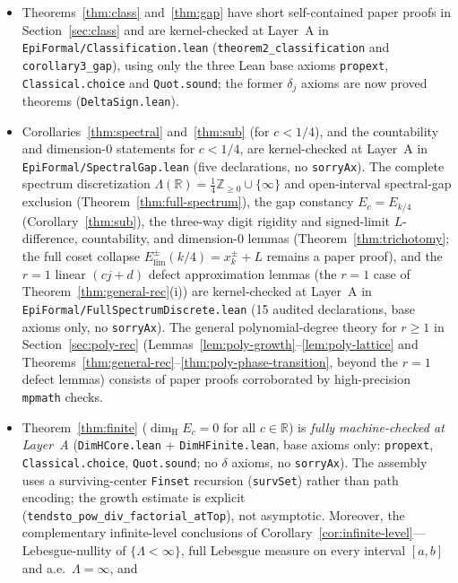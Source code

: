 \documentclass[11pt]{article}
\theoremstyle{definition}
\theoremstyle{remark}
\newcommand{\R}{\mathbb{R}}
\newcommand{\Z}{\mathbb{Z}}
\newcommand{\dimH}{\dim_{\mathrm{H}}}
\newcommand{\Lam}{\Lambda}
\begin{document}
\begin{itemize}[leftmargin=1.5em]
\item Theorems~\ref{thm:class} and~\ref{thm:gap} have short self-contained paper
proofs in Section~\ref{sec:class} and are kernel-checked at Layer~A in
\texttt{EpiFormal/\allowbreak Classification.lean}
(\texttt{theorem2\_classification} and \texttt{corollary3\_gap}), using only the
three Lean base axioms \texttt{propext}, \texttt{Classical.choice} and
\texttt{Quot.sound}; the former $\delta_j$ axioms are now proved theorems
(\texttt{DeltaSign.lean}).
\item Corollaries~\ref{thm:spectral} and~\ref{thm:sub} (for $c<1/4$), and the
countability and dimension-$0$ statements for $c<1/4$, are kernel-checked at
Layer~A in \texttt{EpiFormal/\allowbreak SpectralGap.lean} (five declarations,
no \texttt{sorryAx}). The complete spectrum discretization
$\Lam(\R)=\frac14\Z_{\ge0}\cup\{\infty\}$ and open-interval spectral-gap
exclusion (Theorem~\ref{thm:full-spectrum}), the gap constancy $E_c=E_{k/4}$
(Corollary~\ref{thm:sub}), the three-way digit rigidity and signed-limit
$L$-difference, countability, and dimension-$0$ lemmas
(Theorem~\ref{thm:trichotomy}; the full coset collapse
$E_{\mathrm{lim}}^\pm(k/4)=x_k^\pm+L$ remains a paper proof), and the $r=1$
linear $(cj+d)$ defect approximation lemmas (the $r=1$ case of
Theorem~\ref{thm:general-rec}(i)) are kernel-checked
at Layer~A in \texttt{EpiFormal/\allowbreak FullSpectrumDiscrete.lean} (15
audited declarations, base axioms only, no \texttt{sorryAx}). The general
polynomial-degree theory for $r\ge1$ in Section~\ref{sec:poly-rec}
(Lemmas~\ref{lem:poly-growth}--\ref{lem:poly-lattice} and
Theorems~\ref{thm:general-rec}--\ref{thm:poly-phase-transition}, beyond the
$r=1$ defect lemmas) consists of paper proofs corroborated by high-precision
\texttt{mpmath} checks.
\item Theorem~\ref{thm:finite} ($\dimH E_c=0$ for all $c\in\R$) is \emph{fully
machine-checked at Layer~A} (\texttt{DimHCore.lean} + \texttt{DimHFinite.lean},
base axioms only: \texttt{propext}, \texttt{Classical.choice},
\texttt{Quot.sound}; no $\delta$ axioms, no \texttt{sorryAx}). The assembly uses
a surviving-center \texttt{Finset} recursion (\texttt{survSet}) rather than path
encoding; the growth estimate is explicit
(\texttt{tendsto\_pow\_div\_factorial\_atTop}), not asymptotic. Moreover, the
complementary infinite-level conclusions of
Corollary~\ref{cor:infinite-level}---Lebesgue-nullity of $\{\Lam<\infty\}$,
full Lebesgue measure on every interval $[a,b]$ and a.e.\ $\Lam=\infty$, and

\end{itemize}
\end{document}
